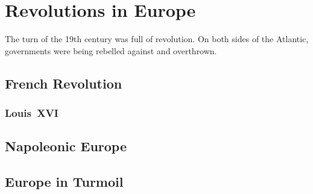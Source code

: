 \chapter{Revolutions in Europe}

The turn of the 19th century was full of revolution.
On both sides of the Atlantic, governments were being rebelled against and overthrown.

\section{French Revolution}

\subsection*{Louis~XVI}

\section{Napoleonic Europe}

\section{Europe in Turmoil}


